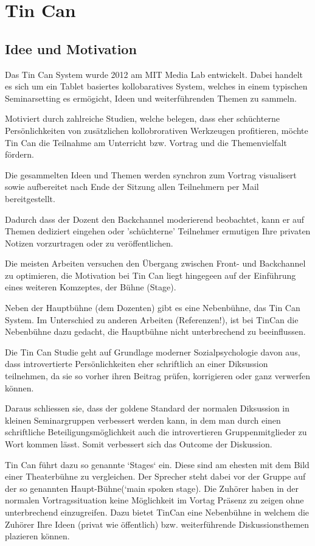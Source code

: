 \section{Tin Can}

\subsection{Idee und Motivation}
Das Tin Can System \cite{HarGorSch2012} wurde 2012 am MIT Media Lab entwickelt.
Dabei handelt es sich um ein Tablet basiertes kollobaratives System, welches in
einem typischen Seminarsetting es ermögicht, Ideen und wei\-ter\-führ\-en\-den
Themen zu sammeln.

Motiviert durch zahlreiche Studien, welche belegen, dass eher schüchterne
Persönlichkeiten von zusätzlichen kollobrorativen Werkzeugen profitieren, möchte
Tin Can die Teilnahme am Unterricht bzw. Vortrag und die Themenvielfalt fördern.

Die gesammelten Ideen und Themen werden synchron zum Vortrag visualisert sowie
aufbereitet nach Ende der Sitzung allen Teilnehmern per Mail bereitgestellt.

Dadurch dass der Dozent den Backchannel moderierend beobachtet, kann er auf
Themen dediziert eingehen oder 'schüchterne' Teilnehmer ermutigen Ihre privaten
Notizen vorzurtragen oder zu veröffentlichen.

Die meisten Arbeiten versuchen den Übergang zwischen Front- und Backchannel zu
optimieren, die Motivation bei Tin Can liegt hingegeen auf der Einführung eines
weiteren Komzeptes, der Bühne (Stage).

Neben der Hauptbühne (dem Dozenten) gibt es eine Nebenbühne, das Tin Can System.
Im Unterschied zu anderen Arbeiten (Referenzen!), ist bei TinCan die Nebenbühne
dazu gedacht, die Hauptbühne nicht unterbrechend zu beeinflussen.

Die Tin Can Studie geht auf Grundlage moderner Sozialpsychologie davon aus, dass
introvertierte Persönlichkeiten eher schriftlich an einer Diksussion teilnehmen,
da sie so vorher ihren Beitrag prüfen, korrigieren oder ganz verwerfen können.

Daraus schliessen sie, dass der goldene Standard der normalen Diksussion in
kleinen Seminargruppen verbessert werden kann, in dem man durch einen
schriftliche Beteiligungsmöglichkeit auch die introvertieren Gruppenmitglieder
zu Wort kommen lässt. Somit verbessert sich das Outcome der Diskussion.

Tin Can führt dazu so genannte `Stages` ein. Diese sind am ehesten mit dem Bild
einer Theaterbühne zu vergleichen. Der Sprecher steht dabei vor der Gruppe auf
der so genannten Haupt-Bühne(`main spoken stage). Die Zuhörer haben in der
normalen Vortragssituation keine Möglichkeit im Vortag Präsenz zu zeigen ohne
unterbrechend einzugreifen. Dazu bietet TinCan eine Nebenbühne in welchem die
Zuhörer Ihre Ideen (privat wie öffentlich) bzw. weiterführende Diskussionsthemen
plazieren können.
 
